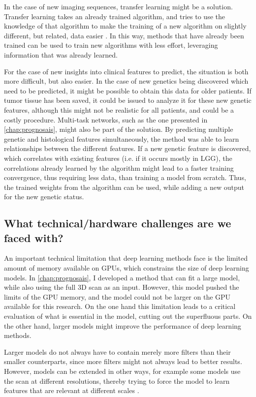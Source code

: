 In the case of new imaging sequences, transfer learning might be a solution.
Transfer learning takes an already trained algorithm, and tries to use the knowledge of that algorithm to make the training of a new algorithm on slightly different, but related, data easier \autocite{shin2016transfer}.
In this way, methods that have already been trained can be used to train new algorithms with less effort, leveraging information that was already learned.

For the case of new insights into clinical features to predict, the situation is both more difficult, but also easier.
In the case of new genetics being discovered which need to be predicted, it might be possible to obtain this data for older patients.
If tumor tissue has been saved, it could be issued to analyze it for these new genetic features, although this might not be realistic for all patients, and could be a costly procedure.
Multi-task networks, such as the one presented in \cref{chap:prognosais}, might also be part of the solution.
By predicting multiple genetic and histological features simultaneously, the method was able to learn relationships between the different features.
If a new genetic feature is discovered, which correlates with existing features (i.e. if it occurs mostly in \gls{LGG}), the correlations already learned by the algorithm might lead to a faster training convergence, thus requiring less data, than training a model from scratch.
Thus, the trained weights from the algorithm can be used, while adding a new output for the new genetic status.


\subsection{What technical/hardware challenges are we faced with?}

An important technical limitation that deep learning methods face is the limited amount of memory available on GPUs, which constrains the size of deep learning models.
In \cref{chap:prognosais}, I developed a method that can fit a large model, while also using the full 3D scan as an input.
However, this model pushed the limits of the GPU memory, and the model could not be larger on the GPU available for this research.
On the one hand this limitation leads to a critical evaluation of what is essential in the model, cutting out the superfluous parts.
On the other hand, larger models might improve the performance of deep learning methods.

Larger models do not always have to contain merely more filters than their smaller counterparts, since more filters might not always lead to better results.
However, models can be extended in other ways, for example some models use the scan at different resolutions, thereby trying to force the model to learn features that are relevant at different scales \autocite{akkus20171p19q}.

